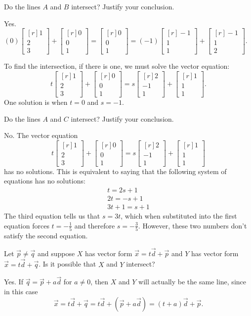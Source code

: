 \documentclass{problemset}
\newcommand{\mat}[1]{\begin{bmatrix*}[r]#1\end{bmatrix*}}
\begin{document}
	\begin{parts}
		\item Do the lines $A$ and $B$ intersect? Justify your conclusion.
			\begin{solution}
				Yes. $(0)\mat{1\\2\\3}+\mat{0\\0\\1} = \mat{0\\0\\1} = (-1)\mat{-1\\1\\1}+\mat{-1\\1\\2}$.

				To find the intersection, if there is one, we must solve the vector equation:
				\[
					t\mat{1\\2\\3}+\mat{0\\0\\1} = s\mat{2\\-1\\1}+\mat{1\\1\\1}.
				\]
				One solution is when $t = 0$ and $s = -1$. 
			\end{solution}
		\item Do the lines $A$ and $C$ intersect? Justify your conclusion.
			\begin{solution}
				No. The vector equation 
				\[
					t\mat{1\\2\\3}+\mat{0\\0\\1} = s\mat{2\\-1\\1}+\mat{1\\1\\1}
				\]
				has no solutions. This is equivalent to saying that the following 
				system of equations has no solutions:
				\begin{gather*}
					t = 2s + 1 \\
					2t = -s + 1 \\
					3t + 1 = s + 1
				\end{gather*}
				The third equation tells us that $s = 3t$, which when substituted 
				into the first equation forces $t = -\tfrac{1}{5}$ and therefore
				$s = -\tfrac{3}{5}$. However, these two numbers don't satisfy the second
				equation.
			\end{solution}
		\item Let $\vec p\neq \vec q$ and suppose
			$X$ has vector form $\vec x=t\vec d+\vec p$ and $Y$ has
			vector form $\vec x=t\vec d+\vec q$. Is it possible
			that $X$ and $Y$ intersect?
			\begin{solution}
				Yes. If $\vec q=\vec p+a\vec d$ for $a\neq 0$, then $X$ and $Y$
				will actually be the same line, since in this case
				\[
					\vec x = t\vec d+\vec q 
					= t\vec d+(\vec p+a\vec d) 
					= (t+a)\vec d+\vec p.
				\]


\end{solution}
\end{parts}
\end{document}
